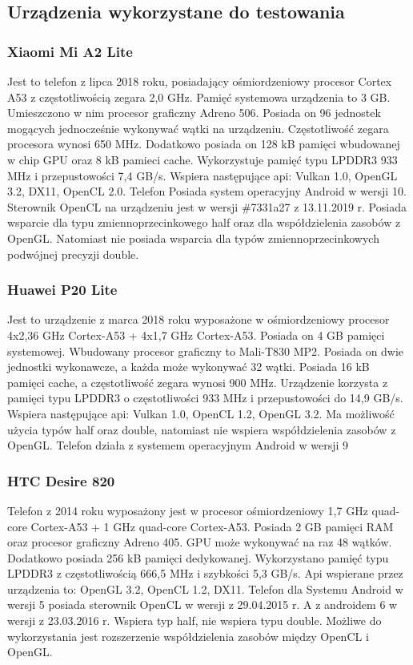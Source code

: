 	
\subsection[Urządzenia wykorzystane do testowania]{Urządzenia wykorzystane do testowania}
\subsubsection[Xiaomi Mi A2 Lite]{Xiaomi Mi A2 Lite}
Jest to telefon z lipca 2018 roku, posiadający ośmiordzeniowy procesor Cortex A53 z częstotliwością zegara 2,0 GHz. Pamięć systemowa urządzenia to 3 GB. Umieszczono w nim procesor graficzny Adreno 506. Posiada on 96 jednostek mogących jednocześnie wykonywać wątki na urządzeniu. Częstotliwość zegara procesora wynosi 650 MHz. Dodatkowo posiada on 128 kB pamięci wbudowanej w chip GPU oraz 8 kB pamieci cache. Wykorzystuje pamięć typu LPDDR3 933 MHz i przepustowości 7,4 GB/s. Wspiera następujące api: Vulkan 1.0, OpenGL 3.2, DX11, OpenCL 2.0. Telefon Posiada system operacyjny Android w wersji 10. Sterownik OpenCL na urządzeniu jest w wersji \#7331a27 z 13.11.2019 r. Posiada wsparcie dla typu zmiennoprzecinkowego half oraz dla współdzielenia zasobów z OpenGL. Natomiast nie posiada wsparcia dla typów zmiennoprzecinkowych podwójnej precyzji double.
\subsubsection[Huawei P20 Lite]{Huawei P20 Lite}
Jest to urządzenie z marca 2018 roku wyposażone w ośmiordzeniowy procesor 4x2,36 GHz Cortex-A53 + 4x1,7 GHz Cortex-A53. Posiada on 4 GB pamięci systemowej. Wbudowany procesor graficzny to Mali-T830 MP2. Posiada on dwie jednostki wykonawcze, a każda może wykonywać 32 wątki. Posiada 16 kB pamięci cache, a częstotliwość zegara wynosi 900 MHz. Urządzenie korzysta z pamięci typu LPDDR3 o częstotliwości 933 MHz i przepustowości do 14,9 GB/s. Wspiera następujące api: Vulkan 1.0, OpenCL 1.2, OpenGL 3.2. Ma możliwość użycia typów half oraz double, natomiast nie wspiera współdzielenia zasobów z OpenGL. Telefon działa z systemem operacyjnym Android w wersji 9
\subsubsection[HTC Desire 820]{HTC Desire 820}
Telefon z 2014 roku wyposażony jest w procesor ośmiordzeniowy 1,7 GHz quad-core Cortex-A53 + 1 GHz quad-core Cortex-A53. Posiada 2 GB pamięci RAM oraz procesor graficzny Adreno 405. GPU może wykonywać na raz 48 wątków. Dodatkowo posiada 256 kB pamięci dedykowanej. Wykorzystano pamięć typu LPDDR3 z częstotliwością 666,5 MHz i szybkości 5,3 GB/s. Api wspierane przez urządzenia to: OpenGL 3.2, OpenCL 1.2, DX11. Telefon dla Systemu Android w wersji 5 posiada sterownik OpenCL w wersji z 29.04.2015 r. A z androidem 6 w wersji z 23.03.2016 r. Wspiera typ half, nie wspiera typu double. Możliwe do wykorzystania jest rozszerzenie współdzielenia zasobów między OpenCL i OpenGL.
